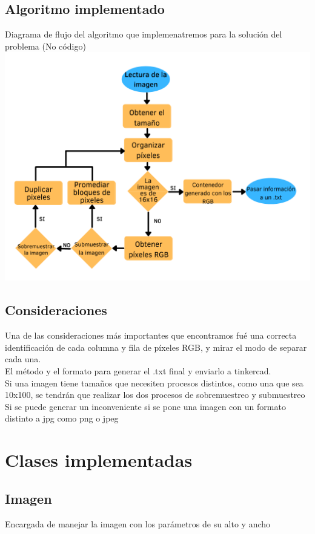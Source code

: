 \documentclass{article}
\begin{document}
\subsection{Algoritmo implementado}
Diagrama de flujo del algoritmo que implemenatremos para la solución del problema (No código)\\
\includegraphics[width=14cm]{Imagenes/Diagrama.png}

\subsection{Consideraciones}
Una de las consideraciones más importantes que encontramos fué una correcta identificación de cada columna y fila de píxeles RGB, y mirar el modo de separar cada una.\\

El método y el formato para generar el .txt final y enviarlo a tinkercad.\\

Si una imagen tiene tamaños que necesiten procesos distintos, como una que sea 10x100, se tendrán que realizar los dos procesos de sobremuestreo y submuestreo\\

Si se puede generar un inconveniente si se pone una imagen con un formato distinto a jpg como png o jpeg\\

\section{Clases implementadas}
\subsection{Imagen}
Encargada de manejar la imagen con los parámetros de su alto y ancho\\
\end{document}
